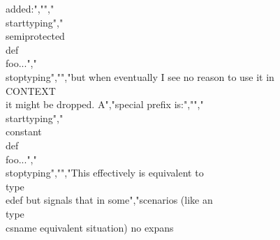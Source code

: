 added:","","\\starttyping","\\semiprotected\\def\\foo{...}","\\stoptyping","","but when eventually I see no reason to use it in \\CONTEXT\\ it might be dropped. A","special prefix is:","","\\starttyping","\\constant\\def\\foo{...}","\\stoptyping","","This effectively is equivalent to \\type {\\edef} but signals that in some","scenarios (like an \\type {\\csname} equivalent situation) no expans
